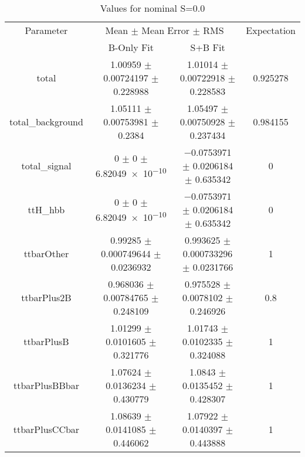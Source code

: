 \begin{table}
\centering
\caption{Values for nominal S=0.0}
\begin{tabular}{cccc}
\toprule
Parameter & \multicolumn{2}{c}{Mean $\pm$ Mean Error $\pm$ RMS} & Expectation\\
 & B-Only Fit & S+B Fit & \\
\midrule
total & \num{1.00959} $\pm$ \num{0.00724197} $\pm$ \num{0.228988} & \num{1.01014} $\pm$ \num{0.00722918} $\pm$ \num{0.228583} & \num{0.925278}\\
total\_background & \num{1.05111} $\pm$ \num{0.00753981} $\pm$ \num{0.2384} & \num{1.05497} $\pm$ \num{0.00750928} $\pm$ \num{0.237434} & \num{0.984155}\\
total\_signal & \num{0} $\pm$ \num{0} $\pm$ \num{6.82049e-10} & \num{-0.0753971} $\pm$ \num{0.0206184} $\pm$ \num{0.635342} & \num{0}\\
ttH\_hbb & \num{0} $\pm$ \num{0} $\pm$ \num{6.82049e-10} & \num{-0.0753971} $\pm$ \num{0.0206184} $\pm$ \num{0.635342} & \num{0}\\
ttbarOther & \num{0.99285} $\pm$ \num{0.000749644} $\pm$ \num{0.0236932} & \num{0.993625} $\pm$ \num{0.000733296} $\pm$ \num{0.0231766} & \num{1}\\
ttbarPlus2B & \num{0.968036} $\pm$ \num{0.00784765} $\pm$ \num{0.248109} & \num{0.975528} $\pm$ \num{0.0078102} $\pm$ \num{0.246926} & \num{0.8}\\
ttbarPlusB & \num{1.01299} $\pm$ \num{0.0101605} $\pm$ \num{0.321776} & \num{1.01743} $\pm$ \num{0.0102335} $\pm$ \num{0.324088} & \num{1}\\
ttbarPlusBBbar & \num{1.07624} $\pm$ \num{0.0136234} $\pm$ \num{0.430779} & \num{1.0843} $\pm$ \num{0.0135452} $\pm$ \num{0.428307} & \num{1}\\
ttbarPlusCCbar & \num{1.08639} $\pm$ \num{0.0141085} $\pm$ \num{0.446062} & \num{1.07922} $\pm$ \num{0.0140397} $\pm$ \num{0.443888} & \num{1}\\
\bottomrule
\end{tabular}
\end{table}